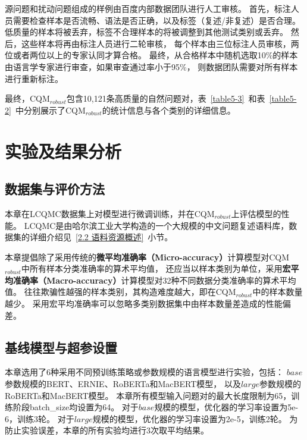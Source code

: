 源问题和扰动问题组成的样例由百度内部数据团队进行人工审核。
首先，标注人员需要检查样本是否流畅、语法是否正确，以及标签（复述/非复述）是否合理。
低质量的样本将被丢弃，标签不合理样本的将被调整到其他测试类别或丢弃。
然后，这些样本将再由标注人员进行二轮审核，
每个样本由三位标注人员审核，两位或者两位以上的专家认同才算合格。
最终，从合格样本中随机选取10\%的样本由语言学专家进行审查，如果审查通过率小于95\%，
则数据团队需要对所有样本进行重新标注。

最终，CQM$_{robust}$包含10,121条高质量的自然问题对，表~\ref{table5-3}~和表~\ref{table5-2}~中分别展示了CQM$_{robust}$的统计信息与各个类别的详细信息。



\section{实验及结果分析}

\subsection{数据集与评价方法}

本章在LCQMC数据集上对模型进行微调训练，并在CQM$_{robust}$上评估模型的性能。
LCQMC是由哈尔滨工业大学构造的一个大规模的中文问题复述语料库，数据集的详细介绍见~\ref{2.2 语料资源概述}~小节。

本章提倡除了采用传统的\textbf{微平均准确率（Micro-accuracy）}计算模型对CQM$_{robust}$中所有样本分类准确率的算术平均值，
还应当以样本类别为单位，采用\textbf{宏平均准确率（Macro-accuracy）}计算模型对32种不同数据分类准确率的算术平均值。
往往欺骗性越强的样本类别，其构造难度越大，即在CQM$_{robust}$中的样本数量越少。
采用宏平均准确率可以忽略多类别数据集中由样本数量差造成的性能偏差。


\subsection{基线模型与超参设置}

本章选用了6种采用不同预训练策略或参数规模的语言模型进行实验，包括：
$base$参数规模的BERT\cite{devlin2018bert}、ERNIE\cite{sun2019ernie}、RoBERTa\cite{liu2019roberta}和MacBERT\cite{cui2020revisiting}模型，
以及$large$参数规模的RoBERTa和MacBERT模型。
本章所有模型输入问题对的最大长度限制为65，训练阶段batch\_size均设置为64。
对于${base}$规模的模型，优化器的学习率设置为5e-6，训练3轮。
对于${large}$规模的模型，优化器的学习率设置为2e-5，训练2轮。
为防止实验误差，本章的所有实验均进行3次取平均结果。


